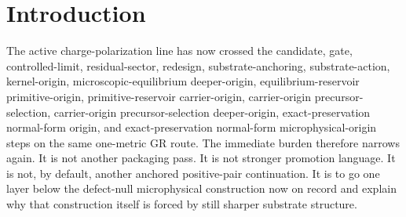 \documentclass[11pt]{article}
\newcommand{\ProtoFunctional}{\mathscr F_{\mathrm{proto}}}
\newcommand{\UltraFunctional}{\mathscr F_{\mathrm{micro}}}
\newcommand{\RootFunctional}{\mathscr F_{\mathrm{hess}}}
\newcommand{\UltraTensor}{\mathfrak M}
\newcommand{\UltraRelabel}{\mathfrak N}
\newcommand{\UltraFree}{\mathfrak P}
\newcommand{\UltraCarProj}{\Pi_{\mathrm{mic,car}}}
\newcommand{\UltraCurProj}{\Pi_{\mathrm{mic,cur}}}
\newcommand{\UltraHomProj}{\Pi_{\mathrm{mic,hom}}}
\newcommand{\TensorHess}{\mathcal H_{\mathrm{car}}}
\newcommand{\CurHess}{\mathcal H_{\mathrm{cur}}}
\newcommand{\HomHess}{\mathcal H_{\mathrm{hom}}}
\begin{document}
\begin{abstract}
The reduced symmetry-compatible equilibrium functional is therefore
\[
\RootFunctional[\UltraTensor,\UltraRelabel,\UltraFree]
\equiv
\ProtoFunctional[
\UltraCarProj\UltraTensor,\UltraCurProj\UltraRelabel,\UltraHomProj\UltraFree]
+\frac12\langle \TensorHess\UltraTensor,\UltraTensor\rangle
+\frac12\langle \CurHess\UltraRelabel,\UltraRelabel\rangle
+\frac12\langle \HomHess\UltraFree,\UltraFree\rangle,
\]
which is exactly the same microphysical exact-preservation functional already recorded one layer above:
\[
\RootFunctional[\UltraTensor,\UltraRelabel,\UltraFree]
=
\UltraFunctional[\UltraTensor,\UltraRelabel,\UltraFree].
\]
Consequently the same ambient projected-sector construction, the same exact-preservation normal form, the same carrier-origin functional, the same primitive reservoir, the same microscopic-equilibrium reservoir, the same \(\Pi_{\mathrm{free}}H=0\) outcome, the same completion solve \(\Sigma^{\mathrm{cmp}}\), the same observer-equation closure, and the same one operative metric are recovered unchanged.

The scope remains disciplined. This note does not classify every possible still sharper symmetry or compatibility structure, and it does not claim a final ultraviolet completion. Its exact positive result is narrower and precise: the defect-null microphysical construction of the previous note is itself forced by a sharper symmetry-compatible equilibrium-response structure, while preserving the same downstream one-metric completion package.
\end{abstract}

\section{Introduction}

The active charge-polarization line has now crossed the candidate, gate, controlled-limit, residual-sector, redesign, substrate-anchoring, substrate-action, kernel-origin, microscopic-equilibrium deeper-origin, equilibrium-reservoir primitive-origin, primitive-reservoir carrier-origin, carrier-origin precursor-selection, carrier-origin precursor-selection deeper-origin, exact-preservation normal-form origin, and exact-preservation normal-form microphysical-origin steps on the same one-metric GR route. The immediate burden therefore narrows again. It is not another packaging pass. It is not stronger promotion language. It is not, by default, another anchored positive-pair continuation. It is to go one layer below the defect-null microphysical construction now on record and explain why that construction itself is forced by still sharper substrate structure.
\end{document}
